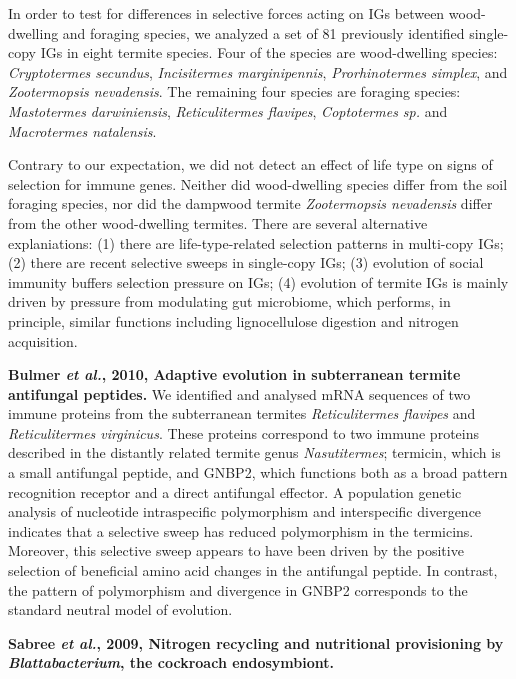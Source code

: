 \documentclass[11pt]{article}
\begin{document}
\begin{sloppypar}
\par
In order to test for differences in selective forces acting on IGs between wood-dwelling and foraging species, we analyzed a set of 81 previously identified single-copy IGs in eight termite species. 
Four of the species are wood-dwelling species: \textit{Cryptotermes secundus}, \textit{Incisitermes marginipennis}, \textit{Prorhinotermes simplex}, and \textit{Zootermopsis nevadensis}. 
The remaining four species are foraging species: \textit{Mastotermes darwiniensis}, \textit{Reticulitermes flavipes}, \textit{Coptotermes sp.} and \textit{Macrotermes natalensis}. 
\par
Contrary to our expectation, we did not detect an effect of life type on signs of selection for immune genes. 
Neither did wood-dwelling species differ from the soil foraging species, nor did the dampwood termite \textit{Zootermopsis nevadensis} differ from the other wood-dwelling termites. 
There are several alternative explaniations: 
(1) there are life-type-related selection patterns in multi-copy IGs; 
(2) there are recent selective sweeps in single-copy IGs; 
(3) evolution of social immunity buffers selection pressure on IGs; 
(4) evolution of termite IGs is mainly driven by pressure from modulating gut microbiome, which performs, in principle, similar functions including lignocellulose digestion and nitrogen acquisition. 
\par
\textbf{Bulmer \textit{et al.}, 2010, Adaptive evolution in subterranean termite antifungal peptides.} \newline
We identified and analysed mRNA sequences of two immune proteins from the subterranean termites \textit{Reticulitermes flavipes} and \textit{Reticulitermes virginicus}. 
These proteins correspond to two immune proteins described in the distantly related termite genus \textit{Nasutitermes}; termicin, which is a small antifungal peptide, and GNBP2, which functions both as a broad pattern recognition receptor and a direct antifungal effector. 
A population genetic analysis of nucleotide intraspecific polymorphism and interspecific divergence indicates that a selective sweep has reduced polymorphism in the termicins. 
Moreover, this selective sweep appears to have been driven by the positive selection of beneficial amino acid changes in the antifungal peptide. 
In contrast, the pattern of polymorphism and divergence in GNBP2 corresponds to the standard neutral model of evolution.
\par
\textbf{Sabree \textit{et al.}, 2009, Nitrogen recycling and nutritional provisioning by \textit{Blattabacterium}, the cockroach endosymbiont.} \newline

\end{sloppypar}
\end{document}
